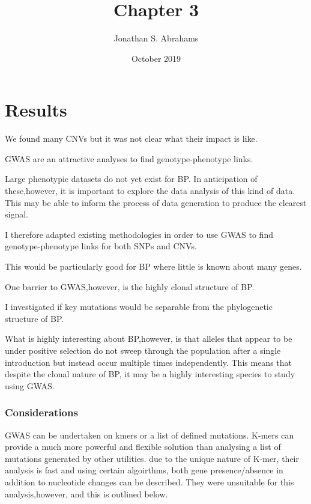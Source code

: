 \documentclass{article}
\title{Chapter 3}
\author{Jonathan S. Abrahams }
\date{October 2019}
\begin{document}
\maketitle

\section{Results}

We found many CNVs but it was not clear what their impact is like.

GWAS are an attractive analyses to find genotype-phenotype links.

Large phenotypic datasets do not yet exist for BP. In anticipation of these,however, it is important to explore the data analysis of this kind of data. This may be able to inform the process of data generation to produce the clearest signal.

I therefore adapted existing methodologies in order to use GWAS to find genotype-phenotype links for both SNPs and CNVs.

This would be particularly good for BP where little is known about many genes.

One barrier to GWAS,however, is the highly clonal structure of BP.

I investigated if key mutations would be separable from the phylogenetic structure of BP.

What is highly interesting about BP,however, is that alleles that appear to be under positive selection do not sweep through the population after a single introduction but instead occur multiple times independently. This means that despite the clonal nature of BP, it may be a highly interesting species to study using GWAS.
\subsubsection{Considerations}

GWAS can be undertaken on kmers or a list of defined mutations. K-mers can provide a much more powerful and flexible solution than analysing a list of mutations generated by other utilities. due to the unique nature of K-mer, their  analysis  is fast and using certain algoirthms,   both gene presence/absence in addition to nucleotide changes can be described. They were unsuitable for this analysis,however, and this is outlined below.


\end{document}
